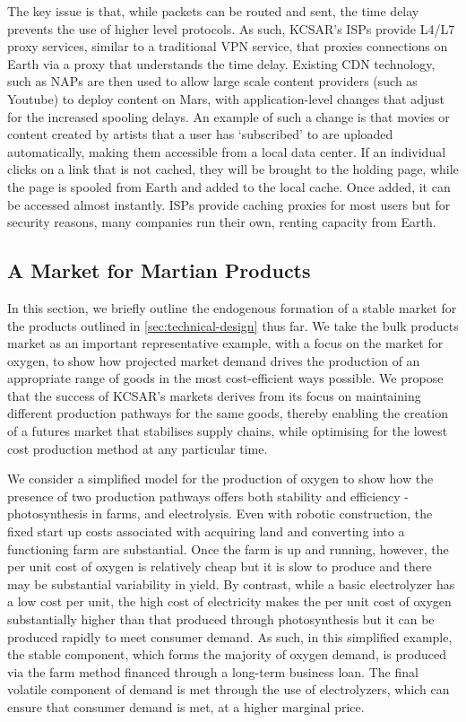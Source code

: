 \documentclass[fleqn,10pt]{Stylesheet} %
\begin{document}
The key issue is that, while packets can be routed and sent, the time delay prevents the use of higher level protocols. As such, KCSAR’s ISPs provide L4/L7 proxy services, similar to a traditional VPN service, that proxies connections on Earth via a proxy that understands the time delay. Existing CDN technology, such as NAPs are then used to allow large scale content providers (such as Youtube) to deploy content on Mars, with application-level changes that adjust for the increased spooling delays. An example of such a change is that movies or content created by artists that a user has ‘subscribed’ to are uploaded automatically, making them accessible from a local data center. If an individual clicks on a link that is not cached, they will be brought to the holding page, while the page is spooled from Earth and added to the local cache. Once added, it can be accessed almost instantly. ISPs provide caching proxies for most users but for security reasons, many companies run their own, renting capacity from Earth.

\subsection{A Market for Martian Products}
In this section, we briefly outline the endogenous formation of a stable market for the products outlined in \ref{sec:technical-design} thus far. We take the bulk products market as an important representative example, with a focus on the market for oxygen, to show how projected market demand drives the production of an appropriate range of goods in the most cost-efficient ways possible. We propose that the success of KCSAR's markets derives from its focus on maintaining different production pathways for the same goods, thereby enabling the creation of a futures market that stabilises supply chains, while optimising for the lowest cost production method at any particular time. 

We consider a simplified model for the production of oxygen to show how the presence of two production pathways offers both stability and efficiency  - photosynthesis in farms, and electrolysis. Even with robotic construction, the fixed start up costs associated with acquiring land and converting into a functioning farm are substantial. Once the farm is up and running, however, the per unit cost of oxygen is relatively cheap but it is slow to produce and there may be substantial variability in yield. By contrast, while a basic electrolyzer has a low cost per unit, the high cost of electricity makes the per unit cost of oxygen substantially higher than that produced through photosynthesis but it can be produced rapidly to meet consumer demand. As such, in this simplified example, the stable component, which forms the majority of oxygen demand, is produced via the farm method financed through a long-term business loan. The final volatile component of demand is met through the use of  electrolyzers, which can ensure that consumer demand is met, at a higher marginal price.
\end{document}
